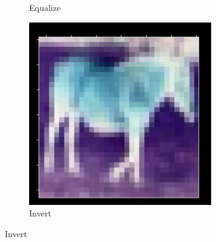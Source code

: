 \documentclass[onecolumn]{ujarticle}   %
\begin{document}
\begin{figure}[h]
\begin{subfigure}{0.3\columnwidth}
        \caption{Equalize}
        \label{fig:Equalize_0}
      \end{subfigure}
      \begin{subfigure}{0.3\columnwidth}
        \centering
        \includegraphics[width=1.0\columnwidth]{transform_test/Invert_0.png}
        \caption{Invert}
        \label{fig:Invert_0}
      \end{subfigure}



\end{figure}
\end{document}
